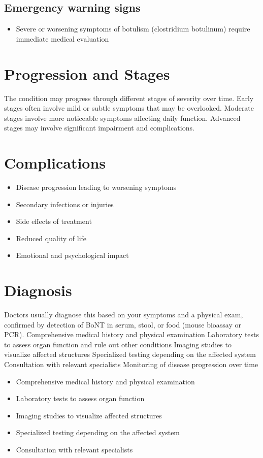 \subsection{Emergency warning signs}
\begin{itemize}[noitemsep]
  \item Severe or worsening symptoms of botulism (clostridium botulinum) require immediate medical evaluation
\end{itemize}
\section{Progression and Stages}
The condition may progress through different stages of severity over time. Early stages often involve mild or subtle symptoms that may be overlooked. Moderate stages involve more noticeable symptoms affecting daily function. Advanced stages may involve significant impairment and complications.
\section{Complications}
\begin{itemize}[noitemsep]
  \item Disease progression leading to worsening symptoms
  \item Secondary infections or injuries
  \item Side effects of treatment
  \item Reduced quality of life
  \item Emotional and psychological impact
\end{itemize}
\section{Diagnosis}
Doctors usually diagnose this based on your symptoms and a physical exam, confirmed by detection of BoNT in serum, stool, or food (mouse bioassay or PCR). Comprehensive medical history and physical examination Laboratory tests to assess organ function and rule out other conditions Imaging studies to visualize affected structures Specialized testing depending on the affected system Consultation with relevant specialists Monitoring of disease progression over time

\begin{itemize}[noitemsep]
  \item Comprehensive medical history and physical examination
  \item Laboratory tests to assess organ function
  \item Imaging studies to visualize affected structures
  \item Specialized testing depending on the affected system
  \item Consultation with relevant specialists
\end{itemize}
